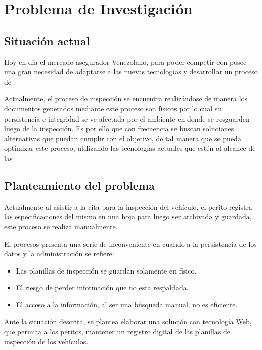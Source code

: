 \chapter{Problema de Investigación}


\section{Situación actual} 

Hoy en día el mercado asegurador Venezolano, para poder competir con posee una gran necesidad de adaptarse a las nuevas tecnologías y desarrollar un proceso de 

Actualmente, el proceso de inspección se encuentra realizándose de manera los documentos generados mediante este proceso son físicos por lo cual su persistencia e integridad se ve afectada por el ambiente en donde se resguarden luego de la inspección. Es por ello que con frecuencia se buscan soluciones alternativas que puedan cumplir con el objetivo, de tal manera que se pueda optimizar este proceso, utilizando las tecnologías actuales que estén al alcance de las 

\section{Planteamiento del problema} 
\setlength{\parskip}{5mm}


Actualmente al asistir a la cita para la inspección del vehículo, el perito registra las especificaciones del mismo en una hoja para luego ser archivada y guardada, este proceso se realiza manualmente.

El procesos presenta una serie de inconveniente en cuando a la persistencia de los datos y la administración se refiere:

\begin{itemize}

	\item Las planillas de inspección se guardan solamente en físico.

	\item El riesgo de perder información que no esta respaldada.

	\item El acceso a la información, al ser una búsqueda manual, no es eficiente. 

\end{itemize}


Ante la situación descrita, se plantea elaborar una solución con tecnología Web, que permita a los peritos, mantener un registro digital de las planillas de inspección de los vehículos.

